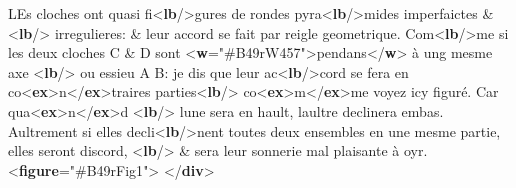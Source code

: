 \begin{shaded}
LEs cloches ont quasi fi{<\textbf{lb}/>}gures de rondes\mbox{}\newline 
\hspace*{1em}\hspace*{1em} pyra{<\textbf{lb}/>}mides imperfaictes \& {<\textbf{lb}/>} irregulieres: \& leur accord se\mbox{}\newline 
{} fait par reigle geometrique. Com{<\textbf{lb}/>}me si les deux cloches C \& D\mbox{}\newline 
{} sont {<\textbf{w}\hspace*{1em}{facs}="{\#B49rW457}">}pendans{</\textbf{w}>} à ung mesme axe {<\textbf{lb}/>} ou essieu A B:\mbox{}\newline 
\hspace*{1em}\hspace*{1em} je dis que leur ac{<\textbf{lb}/>}cord se fera en co{<\textbf{ex}>}n{</\textbf{ex}>}traires parties{<\textbf{lb}/>}\mbox{}\newline 
\hspace*{1em}\hspace*{1em} co{<\textbf{ex}>}m{</\textbf{ex}>}me voyez icy figuré. Car qua{<\textbf{ex}>}n{</\textbf{ex}>}d {<\textbf{lb}/>} lune sera en\mbox{}\newline 
\hspace*{1em}\hspace*{1em} hault, laultre declinera embas. Aultrement si elles decli{<\textbf{lb}/>}nent toutes deux\mbox{}\newline 
\hspace*{1em}\hspace*{1em} ensembles en une mesme partie, elles seront discord, {<\textbf{lb}/>} \& sera leur\mbox{}\newline 
\hspace*{1em}\hspace*{1em} sonnerie mal plaisante à oyr.{<\textbf{figure}\hspace*{1em}{facs}="{\#B49rFig1}">}\mbox{}\newline 
\hspace*{1em}\hspace*{1em}\mbox{}\newline 
\hspace*{1em}\mbox{}\newline 
{}\mbox{}\newline 
{</\textbf{div}>}\end{shaded}\egroup\par \par
